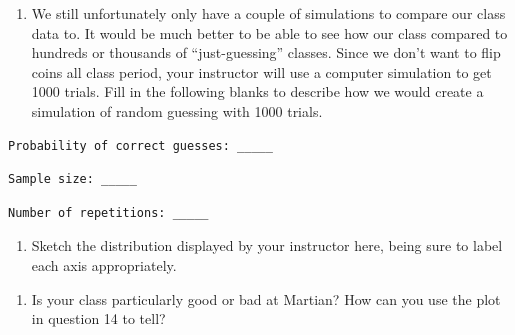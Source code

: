 \documentclass[
]{report}
\providecommand{\tightlist}{%
  \setlength{\itemsep}{0pt}\setlength{\parskip}{0pt}}
\begin{document}
\vspace{1in}

\begin{enumerate}
\def\labelenumi{\arabic{enumi}.}
\setcounter{enumi}{12}
\tightlist
\item
  We still unfortunately only have a couple of simulations to compare our class data to. It would be much better to be able to see how our class compared to hundreds or thousands of ``just-guessing'' classes. Since we don't want to flip coins all class period, your instructor will use a computer simulation to get 1000 trials. Fill in the following blanks to describe how we would create a simulation of random guessing with 1000 trials.
  \vspace{0.1in}
\end{enumerate}

\begin{verbatim}
Probability of correct guesses: _____
\end{verbatim}

\vspace{0.1in}

\begin{verbatim}
Sample size: _____
\end{verbatim}

\vspace{0.1in}

\begin{verbatim}
Number of repetitions: _____
\end{verbatim}

\vspace{0.1in}

\begin{enumerate}
\def\labelenumi{\arabic{enumi}.}
\setcounter{enumi}{13}
\tightlist
\item
  Sketch the distribution displayed by your instructor here, being sure to label each axis appropriately.
\end{enumerate}

\vspace{2in}

\begin{enumerate}
\def\labelenumi{\arabic{enumi}.}
\setcounter{enumi}{14}
\tightlist
\item
  Is your class particularly good or bad at Martian? How can you use the plot in question 14 to tell?
\end{enumerate}

\vspace{1in}
\end{document}
